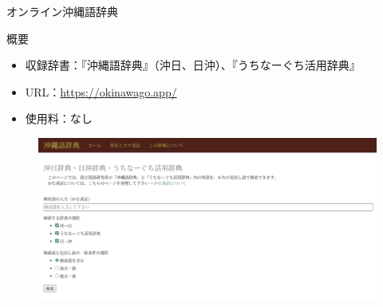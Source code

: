 \documentclass[14pt]{beamer}
\begin{document}
\begin{frame}{オンライン沖縄語辞典}
  \begin{block}{概要}
    \begin{itemize}
    \item  収録辞書：『沖縄語辞典』（沖日、日沖）、『うちなーぐち活用辞典』
    \item  URL：\href{https://okinawago.app/}{https://okinawago.app/}
    \item 使用料：なし
    \end{itemize}
    \begin{figure}[ht]
      \centering
      \includegraphics[height=0.35\paperheight,width=0.5\paperwidth]{okinawago-app-top-page.png}
    \end{figure}
  \end{block}
\end{frame}
\end{document}
